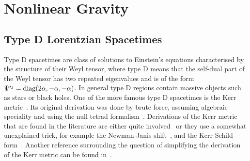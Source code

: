 \documentclass[10pt]{report}
\theoremstyle{definition}
\begin{document}
    \newpage
    \part{Nonlinear Gravity}\label{part:nonlinear-gravity}

    \newpage
\chapter{Type D Lorentzian Spacetimes}\label{chap:type-D-conformal-to-kahler}

Type D spacetimes are class of solutions to Einstein's equations characterised by the structure of their Weyl tensor, where type D means that the self-dual part of the Weyl tensor has two repeated eigenvalues and is of the form $\Psi^{ij} = {\rm diag}(2\alpha,-\alpha,-\alpha)$. In general type D regions contain massive objects such as stars or black holes. One of the more famous type D spacetimes is the Kerr metric~\cite{GravitationalFKerr1963}. Its original derivation was done by brute force, assuming algebraic speciality and using the null tetrad formalism~\cite{An_Approach_to_Newman_1962}. Derivations of the Kerr metric that are found in the literature are either quite involved~\cite{TheMathematicaChandr1998} or they use a somewhat unexplained trick, for example the Newman-Janis shift~\cite{NoteOnTheKerNewman1965,The_Kerr_Newman_Adamo_2014}, and the Kerr-Schild form~\cite{RelativityInMDeruel2018}. Another reference surrounding the question of simplifying the derivation of the Kerr metric can be found in~\cite{PhysicallyMotiBaines2022}.
\end{document}

